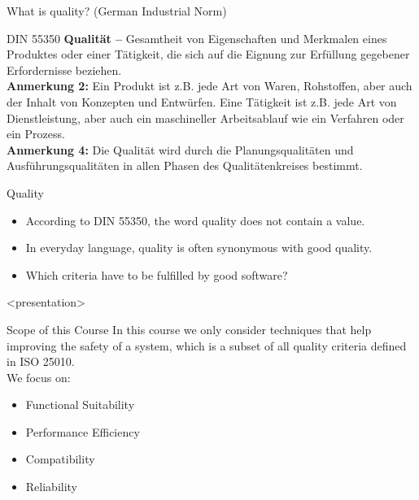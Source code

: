 \begin{frame}{What is quality? (German Industrial Norm)}
\begin{block}{DIN 55350}
\textbf{Qualität --} Gesamtheit von Eigenschaften und Merkmalen eines Produktes oder einer Tätigkeit, die sich auf die Eignung zur Erfüllung gegebener Erfordernisse beziehen.\newline
\\
\textbf{Anmerkung 2:} Ein Produkt ist z.B. jede Art von Waren, Rohstoffen, aber auch der Inhalt von Konzepten und Entwürfen. Eine Tätigkeit ist z.B. jede Art von Dienstleistung, aber auch ein maschineller Arbeitsablauf wie ein Verfahren oder ein Prozess.\newline
\\
\textbf{Anmerkung 4:} Die Qualität wird durch die Planungsqualitäten und Ausführungsqualitäten in allen Phasen des Qualitätenkreises bestimmt.
\end{block}
\end{frame}


\begin{frame}{Quality}
\begin{itemize}
	\item According to DIN 55350, the word quality does not contain a value.
	\item In everyday language, quality is often synonymous with good quality.
	\item Which criteria have to be fulfilled by good software?
\end{itemize}
\end{frame}

\mode
<presentation>


\plain{
	\centering
	\resizebox{!}{.95\textheight}{%
		
	}%
}

\begin{frame}{Scope of this Course}
	In this course we only consider techniques that help improving the safety of a system, which is a subset of all quality criteria defined in ISO 25010.\\
	We focus on:
	\begin{itemize}
		\item Functional Suitability
		\item Performance Efficiency
		\item Compatibility
		\item Reliability
	\end{itemize}
\end{frame}

